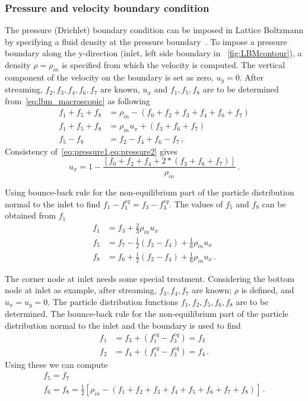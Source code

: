 \subsubsection*{Pressure and velocity boundary condition}

The pressure (Drichlet) boundary condition can be imposed in 
Lattice Boltzmann by specifying a fluid density at the pressure 
boundary~\citep{Zou1997}. To impose a pressure boundary along 
the y-direction (inlet, left side boundary in
~\cref{fig:LBMcontour}), a density $\rho = \rho_{in}$ is 
specified from which the velocity is computed. The 
vertical component of the velocity on the boundary is set as 
zero, $u_y=0$. After streaming, $f_2, f_3, f_4, f_6, f_7$ are 
known, $u_x$ and $f_1, f_5, f_8$ are to be determined 
from~\cref{eq:lbm_macroscopic} as following
%
\begin{align}
 f_1+f_5+f_8 & =  \rho_{in} - (f_0+f_2+f_3+f_4+f_6+f_7) 
 \label{eq:pressure1}\\
 f_1+f_5+f_8 & =  \rho_{in}u_x + (f_3+f_6+f_7) 
 \label{eq:pressure2} \\
 f_5 - f_8  & =  f_2 - f_4 +f_6 -f_7\,,
\end{align}
%
\noindent Consistency of~\cref{eq:pressure1,eq:pressure2} gives
%
\begin{equation}
u_x  = 1 - \frac{[f_0+f_2+f_4+2*(f_3+f_6+f_7)]}{\rho_{in}}\,.
\end{equation}

Using bounce-back rule for the non-equilibrium part of the 
particle distribution normal to the inlet to find $f_1 
-f_1^{eq} = f_3 -f_3^{eq}$. The values of $f_5$ and $f_8$ can 
be obtained from $f_1$
%
\begin{align}
f_1 & = f_3 + \frac{2}{3} \rho_{in}u_x \nonumber \\ 
f_5 & = f_7 - \frac{1}{2}(f_2 - f_4) + \frac{1}{6}\rho_{in}u_x\nonumber \\ 
f_8 & = f_6 + \frac{1}{2}(f_2 - f_4) + \frac{1}{6}\rho_{in}u_x\,.
\end{align}

The corner node at inlet needs some special treatment. 
Considering the bottom node at inlet as example, after 
streaming, $f_3, f_4, f_7$ are known; $\rho$ is 
defined, and $u_x = u_y = 0$. The particle distribution 
functions $f_1, f_2, f_5, f_6, f_8$ are to be determined. The 
bounce-back rule for the non-equilibrium part of the particle 
distribution normal to the inlet and the boundary is used to 
find
%
\begin{align}
f_1 & = f_3 + (f_1^{eq}-f_3^{eq}) = f_3 \\
f_2 & = f_4 + (f_1^{eq}-f_3^{eq}) = f_4 \,.
\end{align}
%
\noindent Using these we can compute
%
\begin{gather}
f_5 = f_7 \\
f_6 = f_8 = \frac{1}{2}[\rho_{in} - (f_1 + f_2 + f_3 + f_4 + f_5 + f_6 + f_7 + 
f_8)]\,.
\end{gather}

